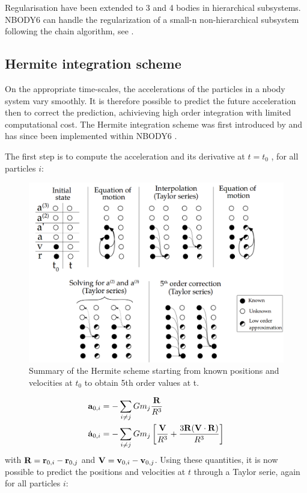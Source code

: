 Regularisation have been extended to 3 and 4 bodies in hierarchical subsystems. NBODY6 can handle the regularization of a small-n non-hierarchical subsystem following the chain algorithm, see \cite{Mikkola1993}.


\subsection{Hermite integration scheme}

On the appropriate time-scales, the accelerations of the particles in a nbody system vary smoothly. It is therefore possible to predict the future acceleration then to correct the prediction, achivieving high order integration with limited computational cost. The Hermite integration scheme was first  introduced by \cite{Makino1991} and has since been implemented within NBODY6 \citep{Aarseth2003}.


The first step is to compute the acceleration and its derivative at $t=t_0$ , for all particles $i$:

\begin{figure}
\center
\includegraphics[width=0.9\linewidth]{Figures/0_hermite_scheme.png}
\caption{Summary of the Hermite scheme starting from known positions and velocities at $t_0$ to obtain 5th order values at t.}
\label{Fig:0_hermite_scheme}
\end{figure} 
 

\begin{align}
\label{Eq:0_Hermite_acc1}
\bold{a}_{0,i} &= - \sum\limits_{i\neq j} G m_j \frac{\bold{R}}{R^3}\\
\label{Eq:0_Hermite_acc2}
\dot{\bold{a}}_{0,i} &=  - \sum\limits_{i\neq j} G m_j \left[ \frac{\bold{V}}{R^3}  + 
	\frac{ 3 \bold{R} ( \bold{V} \cdot \bold{R} )  }{R^3}\right]
\end{align}
with $\bold{R} = \bold{r}_{0,i} - \bold{r}_{0,j} $ and $\bold{V} = \bold{v}_{0,i} - \bold{v}_{0,j} $. Using these quantities, it is now possible to predict the positions and velocities at $t$ through a Taylor serie, again for all particles $i$:

